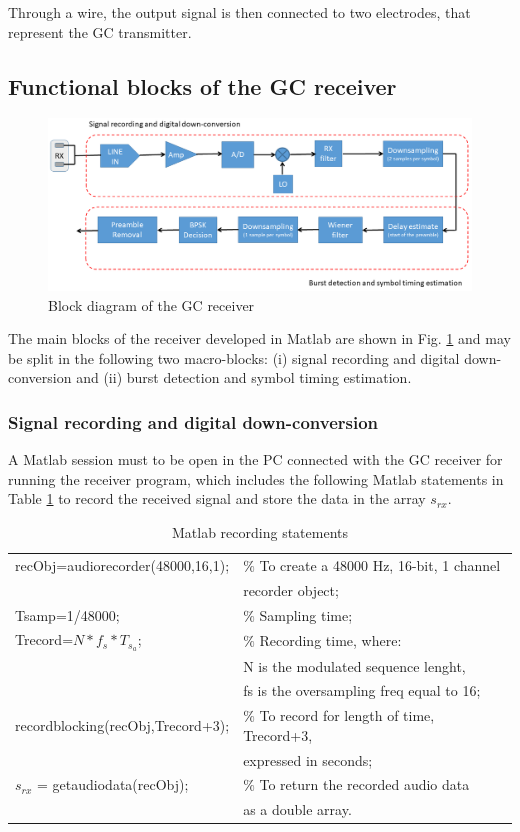 Through a wire, the output signal is then connected to two electrodes, that represent the GC transmitter.

\subsection{Functional blocks of the GC receiver}

\begin{figure}
	\includegraphics[width=\textwidth]{figures/GC_testbed/RX.png}
	\caption{Block diagram of the GC receiver} \label{figRX}
\end{figure}

The main blocks of the receiver developed in Matlab are shown in Fig. \ref{figRX} and may be split in the following two macro-blocks: (i) signal recording and digital down-conversion and (ii) burst detection and symbol timing estimation.

\subsubsection{Signal recording and digital down-conversion}
A Matlab session must to be open in the PC connected with the GC receiver for running the receiver program, which includes the following Matlab statements in Table \ref{tab3} to record the received signal and store the data in the array $s_{rx}$.


\begin{table}
	\caption{Matlab recording statements}\label{tab3}
	\begin{tabular}{|l l|}
		\hline
		recObj=audiorecorder(48000,16,1); &   $\%$ To create a 48000 Hz, 16-bit, 1 channel\\ & \phantom{xx} recorder object;\\
		Tsamp=1/48000;&  $\%$ Sampling time;\\
		Trecord=$N*f_s*T_{s_a}$;&  $\%$ Recording time, where: \\ & \phantom{xx} N is the modulated sequence lenght, \\ & \phantom{xx} fs is the oversampling freq equal to 16;\\
		recordblocking(recObj,Trecord+3);&   $\%$ To record for length of time, Trecord+3,\\ &  \phantom{xx} expressed in seconds;\\
		$s_{rx}$ = getaudiodata(recObj);&   $\%$ To return the recorded audio data\\ & \phantom{xx} as a double array.\\
		\hline
	\end{tabular}
\end{table}

